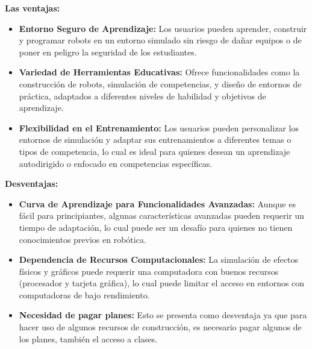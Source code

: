 \textbf{Las ventajas:}

\begin{itemize}
    \item \textbf{Entorno Seguro de Aprendizaje:} Los usuarios pueden aprender, construir y programar robots en un entorno simulado sin riesgo de dañar equipos o de poner en peligro la seguridad de los estudiantes.
    
    \item \textbf{Variedad de Herramientas Educativas:} Ofrece funcionalidades como la construcción de robots, simulación de competencias, y diseño de entornos de práctica, adaptados a diferentes niveles de habilidad y objetivos de aprendizaje.
    
    \item \textbf{Flexibilidad en el Entrenamiento:} Los usuarios pueden personalizar los entornos de simulación y adaptar sus entrenamientos a diferentes temas o tipos de competencia, lo cual es ideal para quienes desean un aprendizaje autodirigido o enfocado en competencias específicas.
\end{itemize}

\textbf{Desventajas:}

\begin{itemize}
    \item \textbf{Curva de Aprendizaje para Funcionalidades Avanzadas:} Aunque es fácil para principiantes, algunas características avanzadas pueden requerir un tiempo de adaptación, lo cual puede ser un desafío para quienes no tienen conocimientos previos en robótica.
    
    \item \textbf{Dependencia de Recursos Computacionales:} La simulación de efectos físicos y gráficos puede requerir una computadora con buenos recursos (procesador y tarjeta gráfica), lo cual puede limitar el acceso en entornos con computadoras de bajo rendimiento.
    
    \item \textbf{Necesidad de pagar planes:} Esto se presenta como desventaja ya que para hacer uso de algunos recursos de construcción, es necesario pagar algunos de los planes, también el acceso a clases.
\end{itemize}
